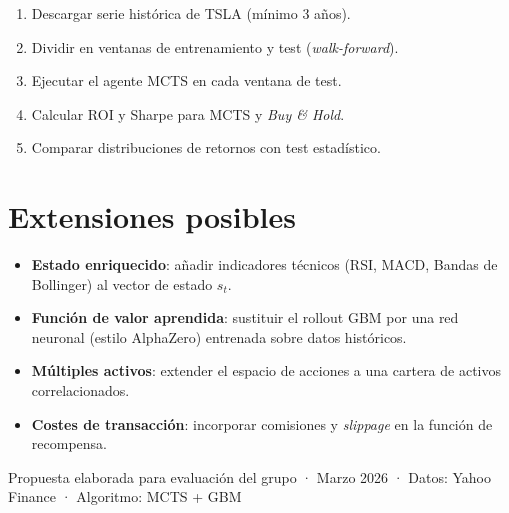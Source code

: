 \documentclass[11pt, a4paper]{article}
\newcommand{\highlight}[2][acc1]{\textcolor{#1}{\textbf{#2}}}
\begin{document}
\vspace{0.5em}

\begin{tcolorbox}[darkcard=acc4, title={Esquema de validación}]
\begin{enumerate}[leftmargin=*, itemsep=3pt]
  \item Descargar serie histórica de TSLA (mínimo 3 años).
  \item Dividir en ventanas de entrenamiento y test (\emph{walk-forward}).
  \item Ejecutar el agente MCTS en cada ventana de test.
  \item Calcular ROI y Sharpe para MCTS y \emph{Buy \& Hold}.
  \item Comparar distribuciones de retornos con test estadístico.
\end{enumerate}
\end{tcolorbox}

\section{Extensiones posibles}

\begin{tcolorbox}[darkcard=mut]
\begin{itemize}[leftmargin=*, itemsep=4pt]
  \item \highlight[acc1]{Estado enriquecido}: añadir indicadores técnicos
    (RSI, MACD, Bandas de Bollinger) al vector de estado $s_t$.
  \item \highlight[acc2]{Función de valor aprendida}: sustituir el rollout
    GBM por una red neuronal (estilo AlphaZero) entrenada sobre datos
    históricos.
  \item \highlight[acc3]{Múltiples activos}: extender el espacio de acciones
    a una cartera de activos correlacionados.
  \item \highlight[acc4]{Costes de transacción}: incorporar comisiones y
    \emph{slippage} en la función de recompensa.
\end{itemize}
\end{tcolorbox}

\vfill
{\footnotesize\color{mut}\centering
  Propuesta elaborada para evaluación del grupo · Marzo 2026 ·
  Datos: Yahoo Finance · Algoritmo: MCTS + GBM}
\end{document}
